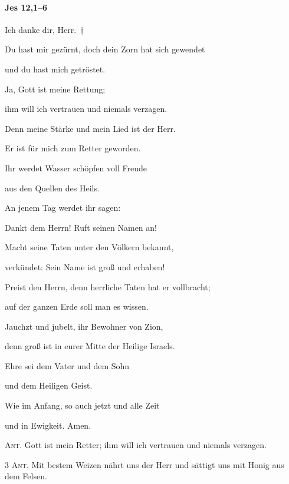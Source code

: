 \paragraph{Jes 12,1--6}

\noindent Ich danke dir, Herr.~†~\nopagebreak

Du hast mir gezürnt, doch dein Zorn hat sich gewendet~\GreStar{}~\nopagebreak

und du hast mich getröstet.

\noindent Ja, Gott ist meine Rettung;~\GreStar{}~\nopagebreak

ihm will ich vertrauen und niemals verzagen.

\noindent Denn meine Stärke und mein Lied ist der Herr.~\GreStar{}~\nopagebreak

Er ist für mich zum Retter geworden.

\noindent Ihr werdet Wasser schöpfen voll Freude~\GreStar{}~\nopagebreak

aus den Quellen des Heils.

\noindent An jenem Tag werdet ihr sagen:~\GreStar{}~\nopagebreak

Dankt dem Herrn! Ruft seinen Namen an!

\noindent Macht seine Taten unter den Völkern bekannt,~\GreStar{}~\nopagebreak

verkündet: Sein Name ist groß und erhaben!

\noindent Preist den Herrn, denn herrliche Taten hat er vollbracht;~\GreStar{}~\nopagebreak

auf der ganzen Erde soll man es wissen.

\noindent Jauchzt und jubelt, ihr Bewohner von Zion,~\GreStar{}~\nopagebreak

denn groß ist in eurer Mitte der Heilige Israels.

\noindent Ehre sei dem Vater und dem Sohn~\GreStar{}~\nopagebreak

und dem Heiligen Geist.

\noindent Wie im Anfang, so auch jetzt und alle Zeit~\GreStar{}~\nopagebreak

und in Ewigkeit. Amen.

\vspace{10pt}

\noindent \textsc{Ant.} Gott ist mein Retter; ihm will ich vertrauen und niemals verzagen. 

\vspace{10pt}

\noindent \textsc{3 Ant.} Mit bestem Weizen nährt uns der Herr und sättigt uns mit Honig aus dem Felsen.

